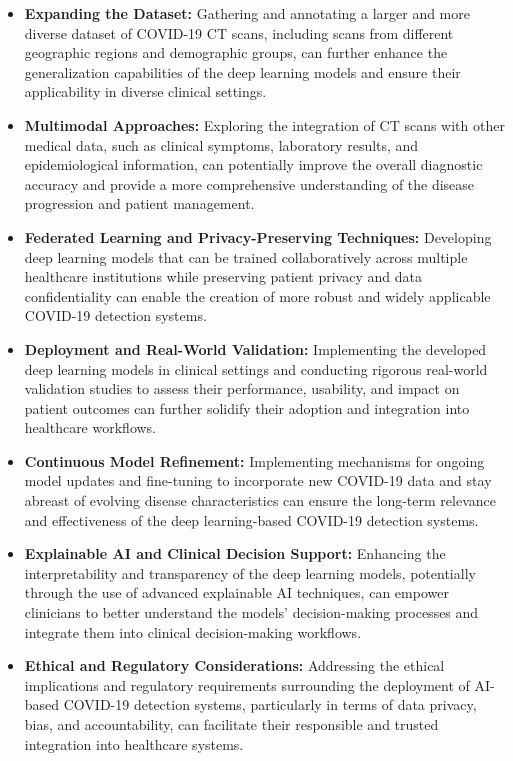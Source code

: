 \documentclass[12pt, a4paper]{report}
\begin{document}
\begin{itemize}
    \item \textbf{Expanding the Dataset:} Gathering and annotating a larger and more diverse dataset of COVID-19 CT scans, including scans from different geographic regions and demographic groups, can further enhance the generalization capabilities of the deep learning models and ensure their applicability in diverse clinical settings.
    \item \textbf{Multimodal Approaches:} Exploring the integration of CT scans with other medical data, such as clinical symptoms, laboratory results, and epidemiological information, can potentially improve the overall diagnostic accuracy and provide a more comprehensive understanding of the disease progression and patient management.
    \item \textbf{Federated Learning and Privacy-Preserving Techniques:} Developing deep learning models that can be trained collaboratively across multiple healthcare institutions while preserving patient privacy and data confidentiality can enable the creation of more robust and widely applicable COVID-19 detection systems.
    \item \textbf{Deployment and Real-World Validation:} Implementing the developed deep learning models in clinical settings and conducting rigorous real-world validation studies to assess their performance, usability, and impact on patient outcomes can further solidify their adoption and integration into healthcare workflows.
    \item \textbf{Continuous Model Refinement:} Implementing mechanisms for ongoing model updates and fine-tuning to incorporate new COVID-19 data and stay abreast of evolving disease characteristics can ensure the long-term relevance and effectiveness of the deep learning-based COVID-19 detection systems.
    \item \textbf{Explainable AI and Clinical Decision Support:} Enhancing the interpretability and transparency of the deep learning models, potentially through the use of advanced explainable AI techniques, can empower clinicians to better understand the models' decision-making processes and integrate them into clinical decision-making workflows.
    \item \textbf{Ethical and Regulatory Considerations:} Addressing the ethical implications and regulatory requirements surrounding the deployment of AI-based COVID-19 detection systems, particularly in terms of data privacy, bias, and accountability, can facilitate their responsible and trusted integration into healthcare systems.

\end{itemize}
\end{document}
